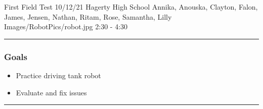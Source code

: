 \insertmeeting 
	{First Field Test} 
	{10/12/21}
	{Hagerty High School}
	{Annika, Anouska, Clayton, Falon, James, Jensen, Nathan, Ritam, Rose, Samantha, Lilly}
	{Images/RobotPics/robot.jpg}
	{2:30 - 4:30}
	
\noindent\hfil\rule{\textwidth}{.4pt}\hfil
\subsubsection*{Goals}
\begin{itemize}
    \item Practice driving tank robot
    \item Evaluate and fix issues 

\end{itemize} 

\noindent\hfil\rule{\textwidth}{.4pt}\hfil

